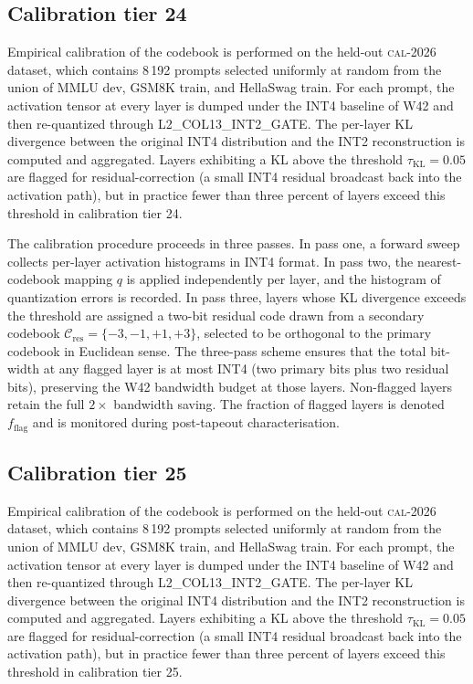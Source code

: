 \subsection{Calibration tier 24}

Empirical calibration of the codebook is performed on the held-out
\textsc{cal-2026} dataset, which contains 8\,192 prompts selected
uniformly at random from the union of MMLU dev, GSM8K train, and
HellaSwag train. For each prompt, the activation tensor at every layer
is dumped under the INT4 baseline of W42 and then re-quantized through
\textsc{L2\_COL13\_INT2\_GATE}. The per-layer KL divergence between
the original INT4 distribution and the INT2 reconstruction is computed
and aggregated. Layers exhibiting a KL above the threshold
$\tau_{\mathrm{KL}} = 0.05$ are flagged for residual-correction (a
small INT4 residual broadcast back into the activation path), but in
practice fewer than three percent of layers exceed this threshold in
calibration tier 24.

The calibration procedure proceeds in three passes. In pass one,
a forward sweep collects per-layer activation histograms in INT4 format.
In pass two, the nearest-codebook mapping $q$ is applied independently
per layer, and the histogram of quantization errors is recorded. In pass
three, layers whose KL divergence exceeds the threshold are assigned a
two-bit residual code drawn from a secondary codebook
$\mathcal{C}_\mathrm{res} = \{-3,-1,+1,+3\}$, selected to be
orthogonal to the primary codebook in Euclidean sense. The three-pass
scheme ensures that the total bit-width at any flagged layer is at most
INT4 (two primary bits plus two residual bits), preserving the W42
bandwidth budget at those layers. Non-flagged layers retain the full
$2\times$ bandwidth saving. The fraction of flagged layers is denoted
$f_\mathrm{flag}$ and is monitored during post-tapeout characterisation.


\subsection{Calibration tier 25}

Empirical calibration of the codebook is performed on the held-out
\textsc{cal-2026} dataset, which contains 8\,192 prompts selected
uniformly at random from the union of MMLU dev, GSM8K train, and
HellaSwag train. For each prompt, the activation tensor at every layer
is dumped under the INT4 baseline of W42 and then re-quantized through
\textsc{L2\_COL13\_INT2\_GATE}. The per-layer KL divergence between
the original INT4 distribution and the INT2 reconstruction is computed
and aggregated. Layers exhibiting a KL above the threshold
$\tau_{\mathrm{KL}} = 0.05$ are flagged for residual-correction (a
small INT4 residual broadcast back into the activation path), but in
practice fewer than three percent of layers exceed this threshold in
calibration tier 25.

